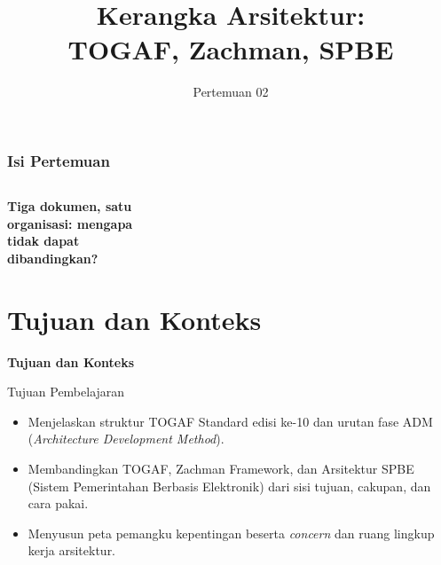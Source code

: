 \documentclass[aspectratio=169, table, 12pt]{beamer}
\title{\Huge Kerangka Arsitektur:\\ \vspace{10pt} TOGAF, Zachman, SPBE}
\date{Pertemuan 02}
\begin{document}
\frame{\titlepage}

\begin{frame}
  \frametitle{Isi Pertemuan}
  \vspace{14pt}
  \begin{columns}[t]
    {\small\tableofcontents[sections={1-3}]}

    {\small\tableofcontents[sections={4-6}]}
  \end{columns}
\end{frame}

\begin{frame}{\hfill}
  \centering
  \Huge{\textbf{Tiga dokumen, satu\\organisasi: mengapa\\tidak dapat\\dibandingkan?}}
\end{frame}

\section{Tujuan dan Konteks}

\begin{frame}{\hfill}
  \centering
  \Huge{\textbf{Tujuan dan Konteks}}
\end{frame}

\begin{frame}{{\Large Tujuan Pembelajaran}}
  \vspace{10pt}
  \begin{itemize}
    \item Menjelaskan struktur TOGAF Standard edisi ke-10 dan urutan fase ADM (\textit{Architecture
          Development Method}).
    \item Membandingkan TOGAF, Zachman Framework, dan Arsitektur SPBE (Sistem Pemerintahan Berbasis
          Elektronik) dari sisi tujuan, cakupan, dan cara pakai.
    \item Menyusun peta pemangku kepentingan beserta \textit{concern} dan ruang lingkup kerja
          arsitektur.
  \end{itemize}
\end{frame}
\end{document}
